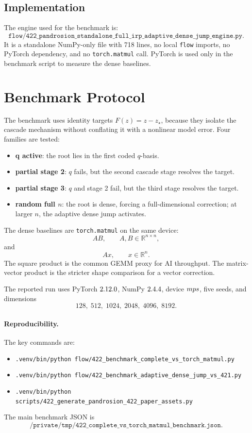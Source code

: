 \documentclass[11pt]{article}
\newcommand{\matmul}{\texttt{torch.matmul}}
\begin{document}
\subsection{Implementation}

The engine used for the benchmark is:
\[
\texttt{flow/422\_pandrosion\_standalone\_full\_irp\_adaptive\_dense\_jump\_engine.py}.
\]
It is a standalone NumPy-only file with 718 lines, no local \texttt{flow}
imports, no PyTorch dependency, and no \matmul{} call.  PyTorch is used only in
the benchmark script to measure the dense baselines.

\section{Benchmark Protocol}

The benchmark uses identity targets \(F(z)=z-z_\star\), because they isolate the
cascade mechanism without conflating it with a nonlinear model error.  Four
families are tested:

\begin{itemize}[leftmargin=1.25em]
\item \textbf{q active}: the root lies in the first coded \(q\)-basis.
\item \textbf{partial stage 2}: \(q\) fails, but the second cascade stage
resolves the target.
\item \textbf{partial stage 3}: \(q\) and stage 2 fail, but the third stage
resolves the target.
\item \textbf{random full \(n\)}: the root is dense, forcing a full-dimensional
correction; at larger \(n\), the adaptive dense jump activates.
\end{itemize}

The dense baselines are \matmul{} on the same device:
\[
        A B,\qquad A,B\in\mathbb R^{n\times n},
\]
and
\[
        A x,\qquad x\in\mathbb R^n.
\]
The square product is the common GEMM proxy for AI throughput.  The
matrix-vector product is the stricter shape comparison for a vector correction.

The reported run uses PyTorch \(2.12.0\), NumPy \(2.4.4\), device
\(mps\), five seeds, and dimensions
\[
        128,\;512,\;1024,\;2048,\;4096,\;8192.
\]

\paragraph{Reproducibility.}
The key commands are:
\begin{itemize}[leftmargin=1.25em]
\item \texttt{.venv/bin/python flow/422\_benchmark\_complete\_vs\_torch\_matmul.py}
\item \texttt{.venv/bin/python flow/422\_benchmark\_adaptive\_dense\_jump\_vs\_421.py}
\item \texttt{.venv/bin/python scripts/422\_generate\_pandrosion\_422\_paper\_assets.py}
\end{itemize}
The main benchmark JSON is
\[
        \texttt{/private/tmp/422\_complete\_vs\_torch\_matmul\_benchmark.json}.
\]
\end{document}
